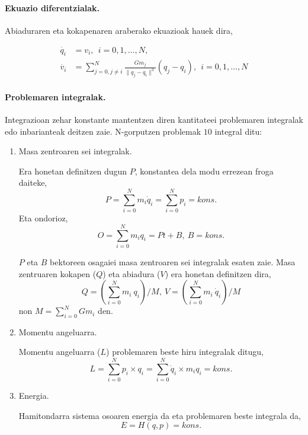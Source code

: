 \paragraph*{Ekuazio diferentzialak.} Abiaduraren eta kokapenaren araberako ekuazioak hauek dira,

\begin{align}
\dot{q_i} &=v_i, \ \  i=0,1,\dots, N,\\
\dot{v_i} &= \sum_{j=0,j \neq i}^{N} \frac{Gm_j}{\|q_j-q_i\|^3} (q_j-q_i) , \ \  i=0,1,\dots, N
\end{align}



\paragraph*{Problemaren integralak.}
Integrazioan zehar konstante mantentzen diren kantitateei problemaren integralak edo inbarianteak deitzen zaie. N-gorputzen problemak $10$ integral ditu:
\begin{enumerate}


\item Masa zentroaren sei integralak.

Era honetan definitzen dugun $P$, konstantea dela modu errezean froga daiteke, 
\begin{equation*}
P=\sum_{i=0}^{N} m_i \dot{q}_i=\sum_{i=0}^{N} p_i=kons. 
\end{equation*}
Eta ondorioz,
\begin{equation*}
O=\sum_{i=0}^{N} m_i {q}_i=Pt+B, \ B=kons. 
\end{equation*}

$P$ eta $B$ bektoreen osagaiei masa zentroaren sei integralak esaten zaie. Masa zentruaren kokapen ($Q$) eta abiadura ($V$)  era honetan definitzen dira, 
\begin{equation*}
Q={\left(\sum\limits_{i=0}^{N} m_i \ q_i\right)}/{M}, \ V={\left(\sum\limits_{i=0}^{N} m_i \ \dot{q}_i\right)}/{M}
\end{equation*}
non $M=\sum\limits_{i=0}^{N}Gm_i$ den.


\item Momentu angeluarra.

Momentu angeluarra ($L$) problemaren beste hiru integralak ditugu, 
\begin{equation*}
L=\sum_{i=0}^{N} p_i \times q_i=\sum_{i=0}^{N} \dot{q}_i \times m_i q_i=kons.
\end{equation*}

\item Energia.

Hamitondarra sistema osoaren energia da eta problemaren beste integrala da,
\begin{equation*}
E=H(q,p)=kons.
\end{equation*}

\end{enumerate}

